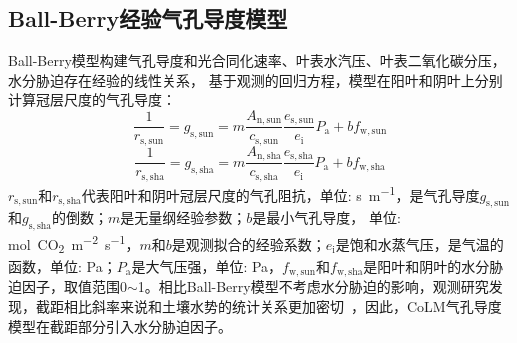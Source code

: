 \subsection{Ball-Berry经验气孔导度模型}



Ball-Berry模型构建气孔导度和光合同化速率、叶表水汽压、叶表二氧化碳分压，水分胁迫存在经验的线性关系，
基于观测的回归方程，模型在阳叶和阴叶上分别计算冠层尺度的气孔导度：
\begin{equation}\label{rs_a1sun}
\frac{1}{r_{\mathrm{s,sun}}}=g_{\mathrm{s,sun}}=m \frac{A_{\mathrm{n,sun}}}{c_{\mathrm{s,sun}}} \frac{e_{\mathrm{s,sun}}}{e_{\mathrm{i}}} P_{\mathrm {a}}+bf_{\mathrm{w,sun}}
\end{equation}
\begin{equation}\label{rs_a1sha}
\frac{1}{r_{\mathrm{s,sha}}}=g_{\mathrm{s,sha}}=m \frac{A_{\mathrm{n,sha}}}{c_{\mathrm{s,sha}}} \frac{e_{\mathrm{s,sha}}}{e_{\mathrm{i}}} P_{\mathrm {a}}+bf_{\mathrm{w,sha}}
\end{equation}
$r_{\mathrm{s,sun}}$和$r_{\mathrm{s,sha}}$代表阳叶和阴叶冠层尺度的气孔阻抗，单位: \unit{s.m^{-1}}，是气孔导度$g_{\mathrm{s,sun}}$和$g_{\mathrm{s,sha}}$的倒数；$m$是无量纲经验参数；$b$是最小气孔导度，
单位: \unit{mol.CO_2.m^{-2}.s^{-1}}，$m$和$b$是观测拟合的经验系数；$e_{\mathrm {i}}$是饱和水蒸气压，是气温的函数，单位: Pa；$P_{\mathrm {a}}$是大气压强，单位: Pa，$f_{\mathrm{w,sun}}$和$f_{\mathrm{w,sha}}$是阳叶和阴叶的水分胁迫因子，取值范围0$\sim$1。相比Ball-Berry模型不考虑水分胁迫的影响，观测研究发现，截距相比斜率来说和土壤水势的统计关系更加密切~\citep{Misson2004,Medlyn2011}，因此，CoLM气孔导度模型在截距部分引入水分胁迫因子。



